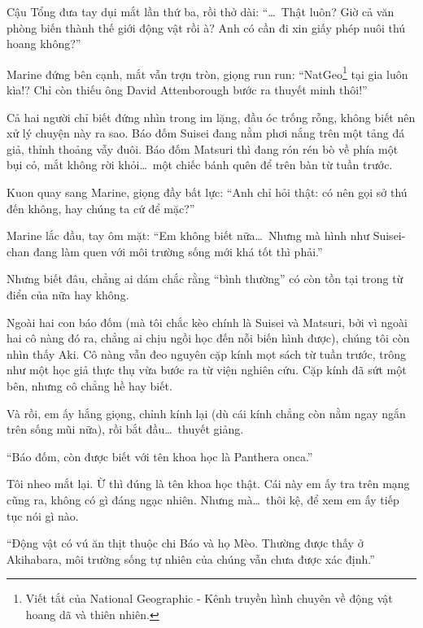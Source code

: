 \documentclass[../main.tex]{subfiles}
\begin{document}

Cậu Tổng đưa tay dụi mắt lần thứ ba, rồi thở dài: ``\dots\ Thật luôn? Giờ cả văn phòng biến thành thế giới động vật rồi à? Anh có cần đi xin giấy phép nuôi thú hoang không?''

Marine đứng bên cạnh, mắt vẫn trợn tròn, giọng run run: ``NatGeo\footnote{Viết tắt của National Geographic - Kênh truyền hình chuyên về động vật hoang dã và thiên nhiên.} tại gia luôn kìa!? Chỉ còn thiếu ông David Attenborough bước ra thuyết minh thôi!''

Cả hai người chỉ biết đứng nhìn trong im lặng, đầu óc trống rỗng, không biết nên xử lý chuyện này ra sao. Báo đốm Suisei đang nằm phơi nắng trên một tảng đá giả, thỉnh thoảng vẫy đuôi. Báo đốm Matsuri thì đang rón rén bò về phía một bụi cỏ, mắt không rời khỏi\dots\ một chiếc bánh quên để trên bàn từ tuần trước.

Kuon quay sang Marine, giọng đầy bất lực: ``Anh chỉ hỏi thật: có nên gọi sở thú đến không, hay chúng ta cứ để mặc?''

Marine lắc đầu, tay ôm mặt: ``Em không biết nữa\dots\ Nhưng mà hình như Suisei-chan đang làm quen với môi trường sống mới khá tốt thì phải.''

Nhưng biết đâu, chẳng ai dám chắc rằng ``bình thường'' có còn tồn tại trong từ điển của \hll nữa hay không.

\omk


Ngoài hai con báo đốm (mà tôi chắc kèo chính là Suisei và Matsuri, bởi vì ngoài hai cô nàng đó ra, chẳng ai chịu ngồi học đến nỗi biến hình được), chúng tôi còn nhìn thấy Aki. Cô nàng vẫn đeo nguyên cặp kính mọt sách từ tuần trước, trông như một học giả thực thụ vừa bước ra từ viện nghiên cứu. Cặp kính đã sứt một bên, nhưng cô chẳng hề hay biết.

Và rồi, em ấy hắng giọng, chỉnh kính lại (dù cái kính chẳng còn nằm ngay ngắn trên sống mũi nữa), rồi bắt đầu\dots\ thuyết giảng.


``Báo đốm, còn được biết với tên khoa học là Panthera onca.''

Tôi nheo mắt lại. Ừ thì đúng là tên khoa học thật. Cái này em ấy tra trên mạng cũng ra, không có gì đáng ngạc nhiên. Nhưng mà\dots\ thôi kệ, để xem em ấy tiếp tục nói gì nào.

``Động vật có vú ăn thịt thuộc chi Báo và họ Mèo. Thường được thấy ở Akihabara, môi trường sống tự nhiên của chúng vẫn chưa được xác định.''
\end{document}
